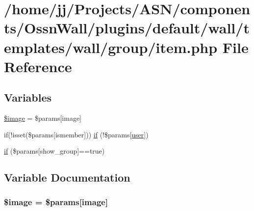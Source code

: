 \hypertarget{components_2_ossn_wall_2plugins_2default_2wall_2templates_2wall_2group_2item_8php}{}\section{/home/jj/\+Projects/\+A\+S\+N/components/\+Ossn\+Wall/plugins/default/wall/templates/wall/group/item.php File Reference}
\label{components_2_ossn_wall_2plugins_2default_2wall_2templates_2wall_2group_2item_8php}
\subsection*{Variables}
\begin{DoxyCompactItemize}
\item 
\hyperlink{components_2_ossn_wall_2plugins_2default_2wall_2templates_2wall_2group_2item_8php_aac6146b4cdec66c94263ddb55afd5946}{\$image} = \$params\mbox{[}\textquotesingle{}image\textquotesingle{}\mbox{]}
\item 
if(!isset(\$params\mbox{[}\textquotesingle{}ismember\textquotesingle{}\mbox{]})) \hyperlink{components_2_ossn_wall_2plugins_2default_2wall_2templates_2wall_2group_2item_8php_af2762c8f9e82ab6a368f1600dbb9cfb8}{if} (!\$params\mbox{[}\textquotesingle{}\hyperlink{ossn_8config_8db_8example_8php_a802544b7ba9f79bbf24ef67773d53bed}{user}\textquotesingle{}\mbox{]})
\item 
\hyperlink{components_2_ossn_wall_2plugins_2default_2wall_2templates_2wall_2group_2item_8php_a1fee8ac9e0278a2a7e0aad13715e84eb}{if} (\$params\mbox{[}\textquotesingle{}show\+\_\+group\textquotesingle{}\mbox{]}==true)
\end{DoxyCompactItemize}


\subsection{Variable Documentation}
\subsubsection[{\texorpdfstring{\$image}{$image}}]{\setlength{\rightskip}{0pt plus 5cm}\$image = \$params\mbox{[}\textquotesingle{}image\textquotesingle{}\mbox{]}}\hypertarget{components_2_ossn_wall_2plugins_2default_2wall_2templates_2wall_2group_2item_8php_aac6146b4cdec66c94263ddb55afd5946}{}\label{components_2_ossn_wall_2plugins_2default_2wall_2templates_2wall_2group_2item_8php_aac6146b4cdec66c94263ddb55afd5946}


